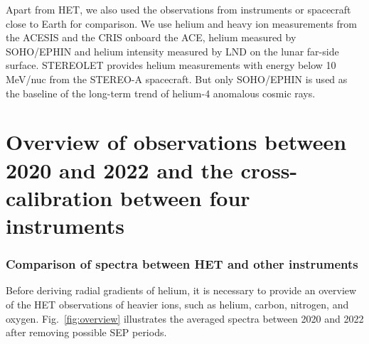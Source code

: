 
Apart from \ac{HET}, we also used the observations from instruments or spacecraft close to Earth for comparison. We use helium and heavy ion measurements from the \ac{ACESIS} and the \ac{CRIS} onboard the \ac{ACE}, helium measured by \acl{SOHO}/\acl{EPHIN} and helium intensity measured by \acl{LND} on the lunar far-side surface. \ac{STEREOLET} provides helium measurements with energy below 10 MeV/nuc from the \ac{STEREO}-A spacecraft. But only \ac{SOHO}/\ac{EPHIN} is used as the baseline of the long-term trend of helium-4 anomalous cosmic rays.

\section{Overview of observations between 2020 and 2022 and the cross-calibration between four instruments}

\subsubsection*{Comparison of spectra between \ac{HET} and other instruments}
Before deriving radial gradients of helium, it is necessary to provide an overview of the \ac{HET} observations of heavier ions, such as helium, carbon, nitrogen, and oxygen. Fig.~\ref{fig:overview} illustrates the averaged spectra between 2020 and 2022 after removing possible \ac{SEP} periods.



